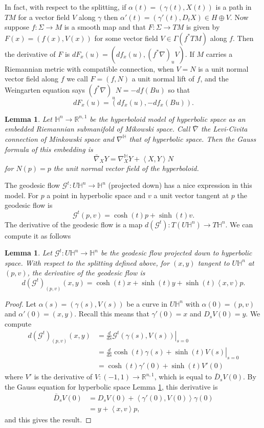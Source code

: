\documentclass{amsart}
\newcommand{\R}{\mathbb{R}}
\newtheorem{lem}[thm]{Lemma}
\renewcommand{\H}{\mathbb{H}}
\begin{document}
In fact, with respect to the splitting, if $\alpha(t) = (\gamma(t),X(t))$ is a path in $TM$ for a vector field $V$ along $\gamma$ then $\alpha'(t) = (\gamma'(t),D_tX) \in H \oplus V$.
Now suppose $f:\Sigma \to M$ is a smooth map and that $F: \Sigma \to TM$ is given by $F(x) = (f(x),V(x))$ for some vector field $V \in \Gamma(f^*TM)$ along $f$.
Then the derivative of $F$ is $dF_x(u) = (df_x(u), (f^*\nabla)_u V)$.
If $M$ carries a Riemannian metric with compatible connection, when $V = N$ is a unit normal vector field along $f$ we call $F = (f,N)$ a unit normal lift of $f$, and the Weingarten equation says $(f^*\nabla)_uN = -df(Bu)$ so that 
\[
dF_x(u) = (df_x(u),-df_x(Bu)).
\]

\begin{lem}
\label{HypAsSub}
Let $\H^n \to \R^{n,1}$ be the hyperboloid model of hyperbolic space as an embedded Riemannian submanifold of Mikowski space. Call $\bar{\nabla}$ the Levi-Civita connection of Minkowski space and $\nabla^{\H}$ that of hyperbolic space. Then the Gauss formula of this embedding is 
\[
\bar{\nabla}_XY = \nabla^{\H}_XY + \left<X,Y\right>N
\]
for $N(p) = p$ the unit normal vector field of the hyperboloid.
\end{lem}

The geodesic flow $\mathcal{G}^t :U \H^n \to \H^n$ (projected down) has a nice expression in this model. 
For $p$ a point in hyperbolic space and $v$ a unit vector tangent at $p$ the geodesic flow is
\[
\mathcal{G}^t(p,v) = \cosh(t)p + \sinh(t)v.
\]
The derivative of the geodesic flow is a map $d(\mathcal{G}^t) : T(U\H^n) \to T\H^n$.
We can compute it as follows

\begin{lem}
\label{DerGeo}
Let $\mathcal{G}^t: U\H^n \to \H^n$ be the geodesic flow projected down to hyperbolic space. With respect to the splitting defined above, for $(x,y)$ tangent to $U\H^n$ at $(p,v)$, the derivative of the geodesic flow is 
\[
d(\mathcal{G}^t)_{(p,v)}(x,y) = \cosh(t)x + \sinh(t)y + \sinh(t)\left<x,v\right>p.
\]
\end{lem}

\begin{proof}
Let $\alpha(s) = (\gamma(s),V(s))$ be a curve in $U\H^n$ with $\alpha(0) = (p,v)$ and $\alpha'(0) = (x,y)$. 
Recall this means that $\gamma'(0) = x$ and $D_sV(0) = y$.
We compute
\begin{align*}
d(\mathcal{G}^t)_{(p,v)}(x,y)
&= \left. \frac{d}{ds} \mathcal{G}^t(\gamma(s),V(s)) \right|_{s=0} \\
&= \left. \frac{d}{ds} \cosh(t)\gamma(s) + \sinh(t)V(s) \right|_{s=0} \\
&= \cosh(t)\gamma'(0) + \sinh(t)V'(0)
\end{align*}
where $V'$ is the derivative of $V: (-1,1) \to \R^{n,1}$, which is equal to $\bar{D}_sV(0)$.
By the Gauss equation for hyperbolic space Lemma \ref{HypAsSub}, this derivative is 
\begin{align*}
\bar{D}_sV(0) 
&= D_sV(0) + \left<\gamma'(0),V(0)\right>\gamma(0) \\
&= y + \left< x, v \right>p,
\end{align*}
and this gives the result. 
\end{proof}
\end{document}
